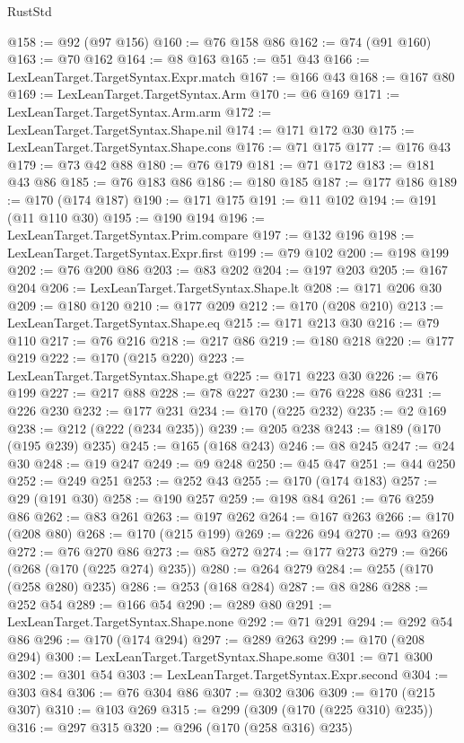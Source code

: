 \begin{lexlean}{RustStd}
\begin{coremodule}
{\begin{coremodule}
{{{{{{{{{{{{{{{@158 := @92 (@97 @156)
@160 := @76 @158 @86
@162 := @74 (@91 @160)
@163 := @70 @162
@164 := @8 @163
@165 := @51 @43
@166 := LexLeanTarget.TargetSyntax.Expr.match
@167 := @166 @43
@168 := @167 @80
@169 := LexLeanTarget.TargetSyntax.Arm
@170 := @6 @169
@171 := LexLeanTarget.TargetSyntax.Arm.arm
@172 := LexLeanTarget.TargetSyntax.Shape.nil
@174 := @171 @172 @30
@175 := LexLeanTarget.TargetSyntax.Shape.cons
@176 := @71 @175
@177 := @176 @43
@179 := @73 @42 @88
@180 := @76 @179
@181 := @71 @172
@183 := @181 @43 @86
@185 := @76 @183 @86
@186 := @180 @185
@187 := @177 @186
@189 := @170 (@174 @187)
@190 := @171 @175
@191 := @11 @102
@194 := @191 (@11 @110 @30)
@195 := @190 @194
@196 := LexLeanTarget.TargetSyntax.Prim.compare
@197 := @132 @196
@198 := LexLeanTarget.TargetSyntax.Expr.first
@199 := @79 @102
@200 := @198 @199
@202 := @76 @200 @86
@203 := @83 @202
@204 := @197 @203
@205 := @167 @204
@206 := LexLeanTarget.TargetSyntax.Shape.lt
@208 := @171 @206 @30
@209 := @180 @120
@210 := @177 @209
@212 := @170 (@208 @210)
@213 := LexLeanTarget.TargetSyntax.Shape.eq
@215 := @171 @213 @30
@216 := @79 @110
@217 := @76 @216
@218 := @217 @86
@219 := @180 @218
@220 := @177 @219
@222 := @170 (@215 @220)
@223 := LexLeanTarget.TargetSyntax.Shape.gt
@225 := @171 @223 @30
@226 := @76 @199
@227 := @217 @88
@228 := @78 @227
@230 := @76 @228 @86
@231 := @226 @230
@232 := @177 @231
@234 := @170 (@225 @232)
@235 := @2 @169
@238 := @212 (@222 (@234 @235))
@239 := @205 @238
@243 := @189 (@170 (@195 @239) @235)
@245 := @165 (@168 @243)
@246 := @8 @245
@247 := @24 @30
@248 := @19 @247
@249 := @9 @248
@250 := @45 @47
@251 := @44 @250
@252 := @249 @251
@253 := @252 @43
@255 := @170 (@174 @183)
@257 := @29 (@191 @30)
@258 := @190 @257
@259 := @198 @84
@261 := @76 @259 @86
@262 := @83 @261
@263 := @197 @262
@264 := @167 @263
@266 := @170 (@208 @80)
@268 := @170 (@215 @199)
@269 := @226 @94
@270 := @93 @269
@272 := @76 @270 @86
@273 := @85 @272
@274 := @177 @273
@279 := @266 (@268 (@170 (@225 @274) @235))
@280 := @264 @279
@284 := @255 (@170 (@258 @280) @235)
@286 := @253 (@168 @284)
@287 := @8 @286
@288 := @252 @54
@289 := @166 @54
@290 := @289 @80
@291 := LexLeanTarget.TargetSyntax.Shape.none
@292 := @71 @291
@294 := @292 @54 @86
@296 := @170 (@174 @294)
@297 := @289 @263
@299 := @170 (@208 @294)
@300 := LexLeanTarget.TargetSyntax.Shape.some
@301 := @71 @300
@302 := @301 @54
@303 := LexLeanTarget.TargetSyntax.Expr.second
@304 := @303 @84
@306 := @76 @304 @86
@307 := @302 @306
@309 := @170 (@215 @307)
@310 := @103 @269
@315 := @299 (@309 (@170 (@225 @310) @235))
@316 := @297 @315
@320 := @296 (@170 (@258 @316) @235)
}}}}}}}}}}}}}}}
\end{coremodule}}
\end{coremodule}
\end{lexlean}
